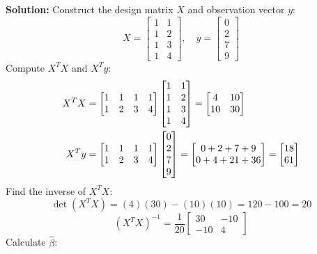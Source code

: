 \documentclass[11pt, letterpaper]{article}
\theoremstyle{definition}
\theoremstyle{remark}
\begin{document}
\textbf{Solution:}
Construct the design matrix $X$ and observation vector $y$:
\[
X = \begin{bmatrix} 1 & 1 \\ 1 & 2 \\ 1 & 3 \\ 1 & 4 \end{bmatrix}, \quad y = \begin{bmatrix} 0 \\ 2 \\ 7 \\ 9 \end{bmatrix}
\]
Compute $X^T X$ and $X^T y$:
\begin{align*}
X^T X &= \begin{bmatrix} 1 & 1 & 1 & 1 \\ 1 & 2 & 3 & 4 \end{bmatrix} \begin{bmatrix} 1 & 1 \\ 1 & 2 \\ 1 & 3 \\ 1 & 4 \end{bmatrix} = \begin{bmatrix} 4 & 10 \\ 10 & 30 \end{bmatrix} \\ \relax
X^T y &= \begin{bmatrix} 1 & 1 & 1 & 1 \\ 1 & 2 & 3 & 4 \end{bmatrix} \begin{bmatrix} 0 \\ 2 \\ 7 \\ 9 \end{bmatrix} = \begin{bmatrix} 0+2+7+9 \\ 0+4+21+36 \end{bmatrix} = \begin{bmatrix} 18 \\ 61 \end{bmatrix}
\end{align*}
Find the inverse of $X^T X$:
\[
\det(X^T X) = (4)(30) - (10)(10) = 120 - 100 = 20
\]
\[
(X^T X)^{-1} = \frac{1}{20} \begin{bmatrix} 30 & -10 \\ -10 & 4 \end{bmatrix}
\]
Calculate $\hat{\beta}$:
\end{document}
